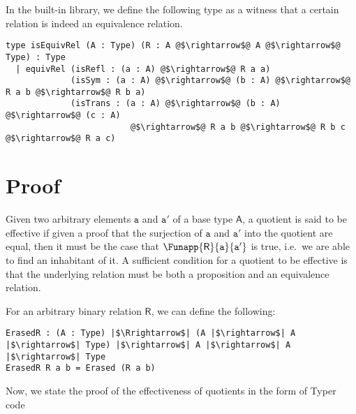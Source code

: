 \documentclass[12pt,twoside,maitrise]{dms}
\theoremstyle{definition}
\numberwithin{equation}{section}
\numberwithin{table}{chapter}
\numberwithin{figure}{chapter}
\newcommand\kw[1] {\textsf{#1}}
\newcommand\id[1] {\texttt{#1}}
\begin{document}
In the built-in library, we define the following type as a witness that a certain relation is indeed an equivalence relation.

\begin{verbatim}
type isEquivRel (A : Type) (R : A @$\rightarrow$@ A @$\rightarrow$@ Type) : Type
  | equivRel (isRefl : (a : A) @$\rightarrow$@ R a a)
             (isSym : (a : A) @$\rightarrow$@ (b : A) @$\rightarrow$@ R a b @$\rightarrow$@ R b a)
             (isTrans : (a : A) @$\rightarrow$@ (b : A) @$\rightarrow$@ (c : A)
                         @$\rightarrow$@ R a b @$\rightarrow$@ R b c @$\rightarrow$@ R a c)
\end{verbatim}

\section{Proof}
Given two arbitrary elements $\id{a}$ and $\id{a}'$ of a base type $\kw{A}$, a
quotient is said to be effective if given a proof that the surjection of $\id{a}$
and $\id{a}'$ into the quotient are equal, then it must be the case that
$\Funapp{\kw{R}}{\id{a}}{\id{a}'}$ is true, i.e.\ we are able to find an
inhabitant of it. A sufficient condition for a quotient to be effective is that
the underlying relation must be both a proposition and an equivalence relation.

For an arbitrary binary relation $\kw{R}$, we can define the following:

\begin{verbatim}
ErasedR : (A : Type) |$\Rrightarrow$| (A |$\rightarrow$| A |$\rightarrow$| Type) |$\rightarrow$| A |$\rightarrow$| A |$\rightarrow$| Type
ErasedR R a b = Erased (R a b)
\end{verbatim}

Now, we state the proof of the effectiveness of quotients in the form of Typer code
\end{document}
